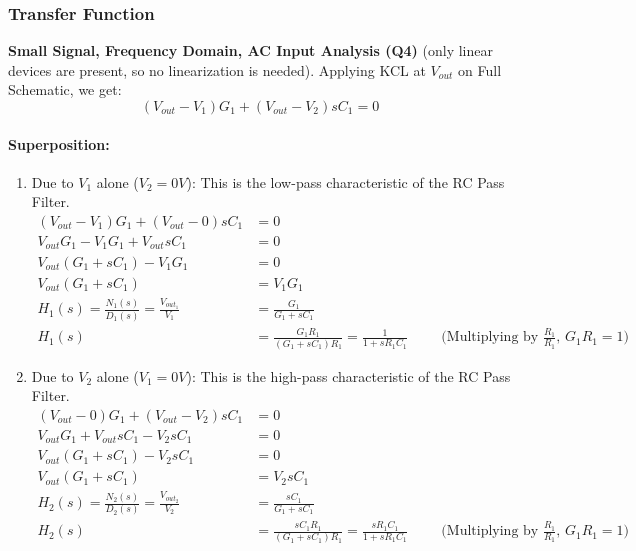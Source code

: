 \subsubsection{Transfer Function}
\textbf{Small Signal, Frequency Domain, AC Input Analysis (Q4)} (only
linear devices are present, so no linearization is needed). Applying KCL
at $V_{out}$ on Full Schematic, we get:
\[
  (V_{out} - V_{1}){G_1} + (V_{out} - V_{2}){sC_1} = 0
\]
\paragraph{Superposition:}
\begin{enumerate}
  \item Due to \(V_{1}\) alone (\(V_{2} = 0V\)):
    This is the low-pass characteristic of the RC Pass Filter.
    \begin{align*}
      (V_{out} - V_{1}){G_1} + (V_{out} - 0){sC_1} &= 0 \\
      V_{out}G_1 - V_{1}G_1 + V_{out}sC_1 &= 0 \\
      V_{out}(G_1 + sC_1) - V_{1}G_1 &= 0 \\
      V_{out}(G_1 + sC_1) &= V_{1}G_1 \\
      H_1(s) = \frac{N_1(s)}{D_1(s)} = \frac{V_{out_1}}{V_{1}} &= \frac{G_1}{G_1 + sC_1} \\
      H_1(s) &= \frac{G_1 R_1}{(G_1 + sC_1) R_1} = \frac{1}{1 + sR_1C_1} \hspace{1cm} \text{(Multiplying by \(\frac{R_1}{R_1}\), \(G_1 R_1 = 1\))}
    \end{align*}
  \item Due to \(V_{2}\) alone (\(V_{1} = 0V\)):
    This is the high-pass characteristic of the RC Pass Filter.
    \begin{align*}
      (V_{out} - 0){G_1} + (V_{out} - V_{2}){sC_1} &= 0 \\
      V_{out}G_1 + V_{out}sC_1 - V_{2}sC_1 &= 0 \\
      V_{out}(G_1 + sC_1) - V_{2}sC_1 &= 0 \\
      V_{out}(G_1 + sC_1) &= V_{2}sC_1 \\
      H_2(s) = \frac{N_2(s)}{D_2(s)} = \frac{V_{out_2}}{V_{2}} &= \frac{sC_1}{G_1 + sC_1} \\
      H_2(s) &= \frac{sC_1 R_1}{(G_1 + sC_1) R_1} = \frac{sR_1C_1}{1 + sR_1C_1} \hspace{1cm} \text{(Multiplying by \(\frac{R_1}{R_1}\), \(G_1 R_1 = 1\))}
    \end{align*}
\end{enumerate}

